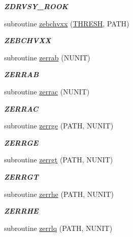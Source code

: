 \begin{DoxyCompactItemize}
\begin{DoxyCompactList}\small\item\em {\bfseries Z\+D\+R\+V\+S\+Y\+\_\+\+R\+O\+O\+K} \end{DoxyCompactList}\item 
subroutine \hyperlink{group__complex16__lin_ga3f3806a102b68ce47af8fee0c5fbf3a0}{zebchvxx} (\hyperlink{zlaqgs_8c_a0656018abfc9fa2821827415f5d5ea57}{T\+H\+R\+E\+S\+H}, P\+A\+T\+H)
\begin{DoxyCompactList}\small\item\em {\bfseries Z\+E\+B\+C\+H\+V\+X\+X} \end{DoxyCompactList}\item 
subroutine \hyperlink{group__complex16__lin_gaaffa3fdf8b7a7af2291a346dbacaa10f}{zerrab} (N\+U\+N\+I\+T)
\begin{DoxyCompactList}\small\item\em {\bfseries Z\+E\+R\+R\+A\+B} \end{DoxyCompactList}\item 
subroutine \hyperlink{group__complex16__lin_ga99a8ca595cf654686ebfd50910813434}{zerrac} (N\+U\+N\+I\+T)
\begin{DoxyCompactList}\small\item\em {\bfseries Z\+E\+R\+R\+A\+C} \end{DoxyCompactList}\item 
subroutine \hyperlink{group__complex16__lin_ga8c8f7483cdc720fab16b8fcb70d034a5}{zerrge} (P\+A\+T\+H, N\+U\+N\+I\+T)
\begin{DoxyCompactList}\small\item\em {\bfseries Z\+E\+R\+R\+G\+E} \end{DoxyCompactList}\item 
subroutine \hyperlink{group__complex16__lin_ga0fdeafb50cbcccdea9de662332c04fa4}{zerrgt} (P\+A\+T\+H, N\+U\+N\+I\+T)
\begin{DoxyCompactList}\small\item\em {\bfseries Z\+E\+R\+R\+G\+T} \end{DoxyCompactList}\item 
subroutine \hyperlink{group__complex16__lin_ga2049172c13429dc2d228133d63822449}{zerrhe} (P\+A\+T\+H, N\+U\+N\+I\+T)
\begin{DoxyCompactList}\small\item\em {\bfseries Z\+E\+R\+R\+H\+E} \end{DoxyCompactList}\item 
subroutine \hyperlink{group__complex16__lin_ga39c5dd459cba9d2c8dff8a69e18da609}{zerrlq} (P\+A\+T\+H, N\+U\+N\+I\+T)

\end{DoxyCompactItemize}
